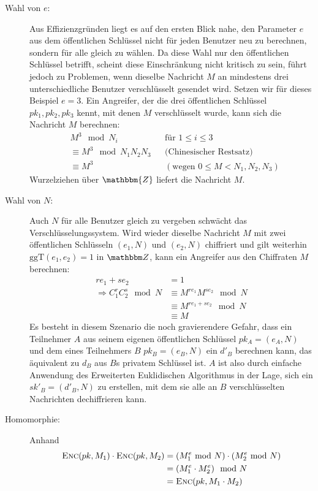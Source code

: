 \begin{description}
    \item[Wahl von $e$:] Aus Effizienzgründen liegt es auf den ersten Blick nahe, den Parameter $e$ aus dem öffentlichen Schlüssel nicht für jeden Benutzer neu
    zu berechnen, sondern für alle gleich zu wählen. Da diese Wahl nur den öffentlichen Schlüssel betrifft, scheint diese Einschränkung nicht kritisch zu sein,
    führt jedoch zu Problemen, wenn dieselbe Nachricht $M$ an mindestens drei unterschiedliche Benutzer verschlüsselt gesendet wird. Setzen wir für dieses Beispiel $e =
    3$. Ein Angreifer, der die drei öffentlichen Schlüssel $pk_1, pk_2, pk_3$ kennt, mit denen $M$ verschlüsselt wurde, kann sich die Nachricht $M$ berechnen:
    \begin{align*}
    & M^3 \mod N_i  && \text{für } 1 \leq i \leq 3\\
    & \equiv M^3 \mod N_1N_2N_3  && \text{(Chinesischer Restsatz)}\\
    & \equiv M^3 && (\text{wegen } 0 \leq M < N_1,N_2,N_3)
    \end{align*}
    Wurzelziehen über $\mathbbm{Z}$ liefert die Nachricht $M$.
    
    \item[Wahl von $N$:] Auch $N$ für alle Benutzer gleich zu vergeben schwächt das Verschlüsselungssystem. Wird wieder dieselbe Nachricht $M$ mit zwei
    öffentlichen Schlüsseln $(e_1, N)$ und $(e_2, N)$ chiffriert und gilt weiterhin $\text{ggT}(e_1, e_2) = 1$ in $\Z{}$, kann ein Angreifer aus den Chiffraten
    $M$ berechnen:
    \begin{align*}
    re_1 + se_2 & = 1\\ 
    \Longrightarrow C_1^rC_2^s \mod N & \equiv M^{re_1}M^{se_2} \mod N\\
    & \equiv M^{re_1 + se_2} \mod N\\
    & \equiv M
    \end{align*}
    Es besteht in diesem Szenario die noch gravierendere Gefahr, dass ein Teilnehmer $A$ aus seinem eigenen öffentlichen Schlüssel $pk_A = (e_A, N)$ und
    dem eines Teilnehmers $B$ $pk_B = (e_B, N)$ ein $d'_B$ berechnen kann, das äquivalent zu $d_B$ aus $B$s privatem Schlüssel ist. $A$ ist also durch einfache
    Anwendung des Erweiterten Euklidischen Algorithmus in der Lage, sich ein $sk'_B = (d'_B, N)$ zu erstellen, mit dem sie alle an $B$ verschlüsselten    
    Nachrichten dechiffrieren kann.
    
    \item[Homomorphie:] Anhand 
     \begin{align*}
     \textsc{Enc}(pk, M_1) \cdot \textsc{Enc}(pk, M_2)
     &= (M_1^e \text{ mod } N) \cdot (M_2^e \text{ mod } N)\\
     &= (M_1^e \cdot M_2^e) \mod N\\
     &= \textsc{Enc}(pk, M_1 \cdot M_2)
     \end{align*}
    

\end{description}
